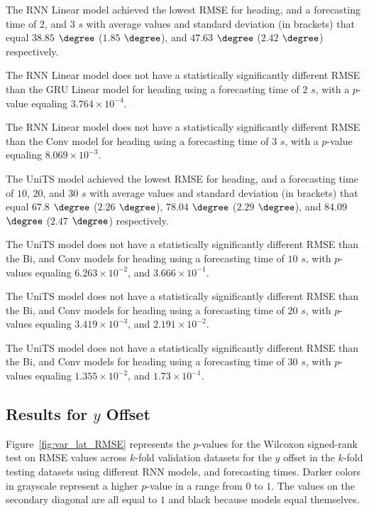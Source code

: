 The RNN Linear model achieved the lowest RMSE for heading, and a forecasting time of $2$, and $3$ $s$ with average values and standard deviation (in brackets) that equal $38.85$ $\degree$ ($1.85$ $\degree$), and $47.63$ $\degree$ ($2.42$ $\degree$) respectively.

The RNN Linear model does not have a statistically significantly different RMSE than the GRU Linear model for heading using a forecasting time of $2$ $s$, with a $p$-value equaling $3.764 \times 10^{-4}$.

The RNN Linear model does not have a statistically significantly different RMSE than the Conv model for heading using a forecasting time of $3$ $s$, with a $p$-value equaling $8.069 \times 10^{-3}$.

The UniTS model achieved the lowest RMSE for heading, and a forecasting time of $10$, $20$, and $30$ $s$ with average values and standard deviation (in brackets) that equal $67.8$ $\degree$ ($2.26$ $\degree$), $78.04$ $\degree$ ($2.29$ $\degree$), and $84.09$ $\degree$ ($2.47$ $\degree$) respectively.

The UniTS model does not have a statistically significantly different RMSE than the Bi, and Conv models for heading using a forecasting time of $10$ $s$, with $p$-values equaling $6.263 \times 10^{-2}$, and $3.666 \times 10^{-1}$.

The UniTS model does not have a statistically significantly different RMSE than the Bi, and Conv models for heading using a forecasting time of $20$ $s$, with $p$-values equaling $3.419 \times 10^{-3}$, and $2.191 \times 10^{-2}$.

The UniTS model does not have a statistically significantly different RMSE than the Bi, and Conv models for heading using a forecasting time of $30$ $s$, with $p$-values equaling $1.355 \times 10^{-2}$, and $1.73 \times 10^{-1}$.

\subsection{Results for $y$ Offset}

Figure~\ref{fig:var_lat_RMSE} represents the $p$-values for the Wilcoxon signed-rank test on RMSE values across $k$-fold validation datasets for the $y$ offset in the $k$-fold testing datasets using different RNN models, and forecasting times. Darker colors in grayscale represent a higher $p$-value in a range from $0$ to $1$. The values on the secondary diagonal are all equal to $1$ and black because models equal themselves.

